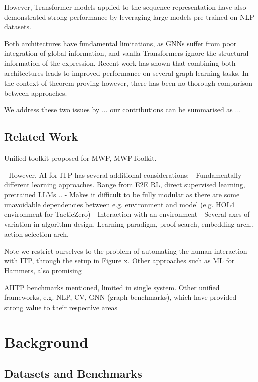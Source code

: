 \documentclass[letterpaper]{article} %
\begin{document}
    However, Transformer models applied to the sequence representation have also demonstrated strong performance by
    leveraging large models pre-trained on NLP datasets.

    Both architectures have fundamental limitations, as GNNs suffer from poor integration of global information, and vanlla
    Transformers ignore the structural information of the expression.
    Recent work has shown that combining both architectures leads to improved performance on several graph learning tasks.
    In the context of theorem proving however, there has been no thorough comparison between approaches.

    We address these two issues by ... our contributions can be summarised as ...

    \subsection{Related Work}
    Unified toolkit proposed for MWP, MWPToolkit.

    - However, AI for ITP has several additional considerations:
    - Fundamentally different learning approaches. Range from E2E RL, direct supervised learning, pretrained LLMs ..
    - Makes it difficult to be fully modular as there are some unavoidable dependencies between e.g. environment and
    model (e.g. HOL4 environment for TacticZero)
    - Interaction with an environment
    - Several axes of variation in algorithm design. Learning paradigm, proof search, embedding arch., action selection
    arch.

    Note we restrict ourselves to the problem of automating the human interaction with ITP, through the setup in Figure x.
    Other approaches such as ML for Hammers, also promising

    AIITP benchmarks mentioned, limited in single system.
    Other unified frameworks, e.g. NLP, CV, GNN (graph benchmarks), which have provided strong value to their respective areas


    \section{Background}

    \subsection{Datasets and Benchmarks}
\end{document}
